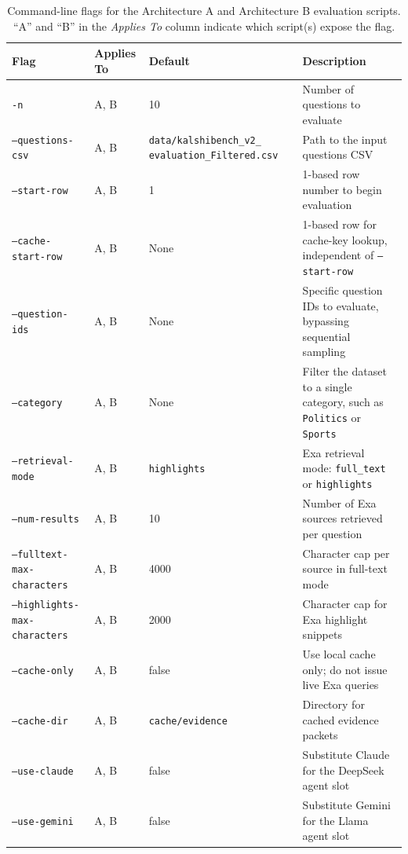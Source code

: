 \begin{table}[ht]
\centering
\caption{Command-line flags for the Architecture A and Architecture B evaluation scripts.
``A'' and ``B'' in the \textit{Applies To} column indicate which script(s) expose the flag.}
\label{tab:cli-flags}
\renewcommand{\arraystretch}{1.3}
\small
\begin{tabular}{p{4cm} p{1.5cm} p{3.5cm} p{5.5cm}}
\toprule
\textbf{Flag} & \textbf{Applies To} & \textbf{Default} & \textbf{Description} \\
\midrule
\texttt{-n} & A, B & 10 & Number of questions to evaluate \\
\texttt{--questions-csv} & A, B & \texttt{data/kalshibench\_v2\_} \newline \texttt{evaluation\_Filtered.csv} & Path to the input questions CSV \\
\texttt{--start-row} & A, B & 1 & 1-based row number to begin evaluation \\
\texttt{--cache-start-row} & A, B & None & 1-based row for cache-key lookup, independent of \texttt{--start-row} \\
\texttt{--question-ids} & A, B & None & Specific question IDs to evaluate, bypassing sequential sampling \\
\texttt{--category} & A, B & None & Filter the dataset to a single category, such as \texttt{Politics} or \texttt{Sports} \\
\texttt{--retrieval-mode} & A, B & \texttt{highlights} & Exa retrieval mode: \texttt{full\_text} or \texttt{highlights} \\
\texttt{--num-results} & A, B & 10 & Number of Exa sources retrieved per question \\
\texttt{--fulltext-max-\newline characters} & A, B & 4000 & Character cap per source in full-text mode \\
\texttt{--highlights-\newline max-characters} & A, B & 2000 & Character cap for Exa highlight snippets \\
\texttt{--cache-only} & A, B & false & Use local cache only; do not issue live Exa queries \\
\texttt{--cache-dir} & A, B & \texttt{cache/evidence} & Directory for cached evidence packets \\
\texttt{--use-claude} & A, B & false & Substitute Claude for the DeepSeek agent slot \\
\texttt{--use-gemini} & A, B & false & Substitute Gemini for the Llama agent slot \\

\end{tabular}
\end{table}
